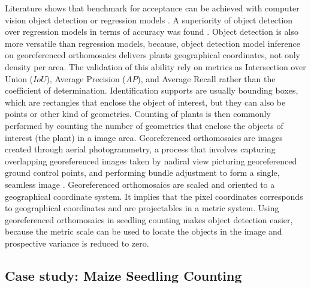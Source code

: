 \documentclass[12pt,a4paper,oneside]{report}
\begin{document}
Literature shows that benchmark for acceptance can be achieved with computer vision object detection
 \cite{liuIntegrateNetDeepLearning2022,davidPlantDetectionCounting2021,barretoAutomaticUAVbasedCounting2021}
or regression models \cite{liuEstimatingMaizeSeedling2022,EstimatesMaizePlant}.
A superiority of object detection over regression models in terms of accuracy was found
\cite{zouMaizeTasselsDetection2020}. Object detection is also more versatile than
regression models, because, object detection model inference on georeferenced orthomosaics delivers 
plants geographical coordinates, not only density per area.
The validation of this ability rely on metrics as Intersection over Union ($IoU$),
Average Precision ($AP$), and Average Recall \cite{linMicrosoftCOCOCommon2015} rather than
the coefficient of determination. 
Identification supports are usually bounding boxes, which are rectangles that enclose
the object of interest, but they can also be points or other kind of geometries.
Counting of plants is then commonly performed by counting the number of geometries 
that enclose the objects of interest (the plant) in a image area.
Georeferenced orthomosaics are images created through aerial photogrammetry, a process 
that involves capturing overlapping georeferenced images taken by nadiral view 
picturing georeferenced ground control points, and performing bundle adjustment to form 
a single, seamless image \cite{krausPhotogrammetryGeometryImages2011}.
Georeferenced orthomosaics are scaled and oriented to a geographical coordinate system.
It implies that the pixel coordinates corresponds to 
geographical coordinates and are projectables in a metric system.
Using georeferenced orthomosaics in seedling counting makes object detection 
easier, because the metric scale can be used to locate the objects 
in the image and prospective variance is reduced to zero.

\subsection{Case study: Maize Seedling Counting}
\end{document}
